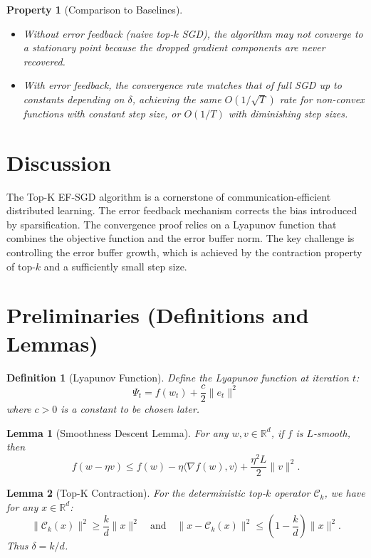 \documentclass{article}
\newtheorem{lemma}{Lemma}
\newtheorem{definition}{Definition}
\newtheorem{property}{Property}
\begin{document}
\begin{property}[Comparison to Baselines]
\begin{itemize}
    \item Without error feedback (naive top-$k$ SGD), the algorithm may not converge to a stationary point because the dropped gradient components are never recovered.
    \item With error feedback, the convergence rate matches that of full SGD up to constants depending on $\delta$, achieving the same $O(1/\sqrt{T})$ rate for non-convex functions with constant step size, or $O(1/T)$ with diminishing step sizes.
\end{itemize}
\end{property}

\section*{Discussion}
The Top-K EF-SGD algorithm is a cornerstone of communication-efficient distributed learning. The error feedback mechanism corrects the bias introduced by sparsification. The convergence proof relies on a Lyapunov function that combines the objective function and the error buffer norm. The key challenge is controlling the error buffer growth, which is achieved by the contraction property of top-$k$ and a sufficiently small step size.

\section*{Preliminaries (Definitions and Lemmas)}

\begin{definition}[Lyapunov Function]
Define the Lyapunov function at iteration $t$:
\[
\Psi_t = f(w_t) + \frac{c}{2} \|e_t\|^2
\]
where $c > 0$ is a constant to be chosen later.
\end{definition}

\begin{lemma}[Smoothness Descent Lemma]
For any $w, v \in \mathbb{R}^d$, if $f$ is $L$-smooth, then
\[
f(w - \eta v) \le f(w) - \eta \langle \nabla f(w), v \rangle + \frac{\eta^2 L}{2} \|v\|^2.
\]
\end{lemma}

\begin{lemma}[Top-K Contraction]
For the deterministic top-$k$ operator $\mathcal{C}_k$, we have for any $x \in \mathbb{R}^d$:
\[
\|\mathcal{C}_k(x)\|^2 \ge \frac{k}{d} \|x\|^2 \quad \text{and} \quad \|x - \mathcal{C}_k(x)\|^2 \le \left(1 - \frac{k}{d}\right) \|x\|^2.
\]
Thus $\delta = k/d$.
\end{lemma}
\end{document}
